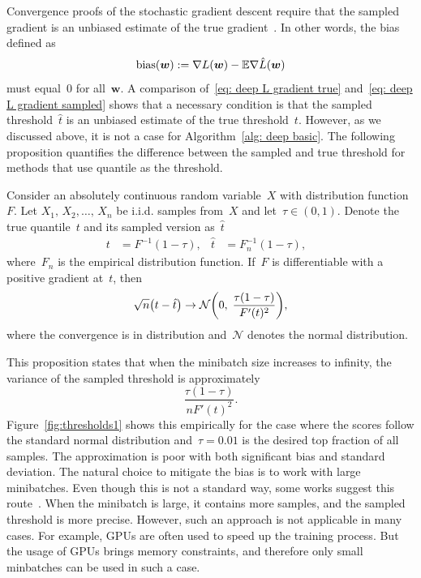 Convergence proofs of the stochastic gradient descent require that the sampled gradient is an unbiased estimate of the true gradient~\cite{bottou2018optimization}. In other words, the bias defined as 
\begin{equation}\label{eq:defin_bias}
  \operatorname{bias}(\bm{w}) := \nabla L(\bm{w}) - \mathbb{E} \nabla \hat{L}(\bm{w})
\end{equation}
must equal~$0$ for all~$\bm{w}$. A comparison of~\eqref{eq: deep L gradient true} and~\eqref{eq: deep L gradient sampled} shows that a necessary condition is that the sampled threshold~$\hat{t}$ is an unbiased estimate of the true threshold~$t$. However, as we discussed above, it is not a case for Algorithm~\ref{alg: deep basic}. The following proposition quantifies the difference between the sampled and true threshold for methods that use quantile as the threshold.

\begin{proposition}\label{proposition:bound}
  Consider an absolutely continuous random variable~$X$ with distribution function~$F.$ Let $X_1,\, X_2, \ldots, \, X_n$ be i.i.d. samples from~$X$ and let~$\tau \in (0,1).$ Denote the true quantile~$t$ and its sampled version as~$\hat{t}$
  \begin{align*}
    t & = F^{-1}(1 - \tau), &
    \hat{t} & = F_{n}^{-1}(1 - \tau), &
  \end{align*}
  where~$F_{n}$ is the empirical distribution function. If~$F$ is differentiable with a positive gradient at~$t$, then
  \begin{equation*}
    \sqrt{n}\Brac{t - \hat{t}} \rightarrow \mathcal{N} \Brac{0, \; \frac{\tau(1-\tau)}{F'(t)^2}},
  \end{equation*}
  where the convergence is in distribution and~$\mathcal{N}$ denotes the normal distribution.
\end{proposition}

This proposition states that when the minibatch size increases to infinity, the variance of the sampled threshold is approximately
\begin{equation*}
  \frac{\tau(1-\tau)}{nF'(t)^2}.
\end{equation*}
Figure~\ref{fig:thresholds1} shows this empirically for the case where the scores follow the standard normal distribution and~$\tau=0.01$ is the desired top fraction of all samples. The approximation is poor with both significant bias and standard deviation. The natural choice to mitigate the bias is to work with large minibatches. Even though this is not a standard way, some works suggest this route~\cite{you2019large}. When the minibatch is large, it contains more samples, and the sampled threshold is more precise. However, such an approach is not applicable in many cases. For example, GPUs are often used to speed up the training process. But the usage of GPUs brings memory constraints, and therefore only small minbatches can be used in such a case.

